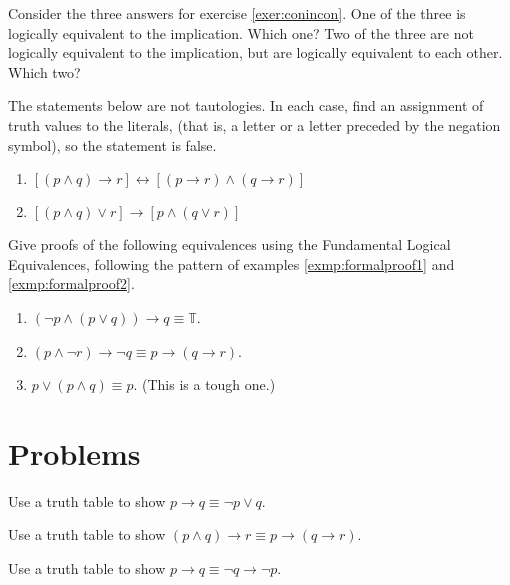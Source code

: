 \begin{exer} Consider the three answers for exercise \ref{exer:conincon}.
One of the three is logically equivalent to the implication. Which one?
Two of the three are not logically equivalent to the implication, but are
logically equivalent to each other. Which two?
\end{exer}

\begin{exer}
The statements below are not tautologies. In each case, find an assignment of truth values to the literals, (that is, a letter or a letter preceded
by the negation symbol), so the statement is false.
\begin{enumerate}[label= \alph*)]
\item $[(p\land q)\to r]\longleftrightarrow [(p\to r)\land (q\to r)]$

\item $[(p\land q)\lor r]\to [p\land (q\lor r)]$
\end{enumerate}
\end{exer}

\begin{exer}
Give proofs of the following equivalences using the Fundamental Logical Equivalences, following the pattern
of examples \ref{exmp:formalproof1} and \ref{exmp:formalproof2}.
\begin{enumerate}[label= \alph*)]
\item $(\lnot p \land (p \lor q))\to q \equiv \mathbb{T}$.

\item $(p\land\lnot r)\to\lnot q \equiv p\to(q\to r)$.

\item $p\lor(p\land q)\equiv p$. (This is a tough one.)\label{setablaw}
\end{enumerate}
\end{exer}

\section{Problems}

\begin{prob}
Use a truth table to show $p\to q\equiv \lnot p \lor q$.
\end{prob}

\begin{prob}
Use a truth table to show $(p\land q)\to r \equiv p\to (q\to r)$.
\end{prob}

\begin{prob}
Use a truth table to show $p\to q\equiv \lnot q\to \lnot p$.
\end{prob}

